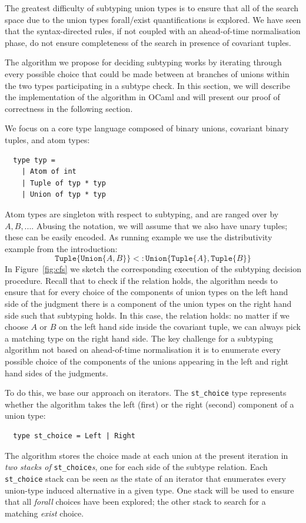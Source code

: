 \documentclass[a4paper,english]{lipics-v2018}
\newcommand{\xt}[1]{\texttt{#1}}
\newcommand{\union}[2]{\xt{Union\{}#1,#2\xt{\}}}
\newcommand{\tuple}[1]{\xt{Tuple\{}#1\xt{\}}}
\begin{document}
The greatest difficulty of subtyping union types is to ensure that all of
the search space due to the union types forall/exist quantifications
is explored.  We have seen that the syntax-directed rules, if not
coupled with an ahead-of-time normalisation phase, do not ensure
completeness of the search in presence of covariant tuples.

The algorithm we propose for deciding subtyping works by iterating through every possible
choice that could be made between at branches of unions within the two types
participating in a subtype check. In this section, we will describe the
implementation of the algorithm in OCaml and will present our proof of
correctness in the following section.

We focus on a core type language composed of binary unions, covariant binary
tuples, and atom types:
\begin{small}
\begin{verbatim}
  type typ =
    | Atom of int
    | Tuple of typ * typ
    | Union of typ * typ
\end{verbatim}
\end{small}
Atom types are singleton with respect to subtyping, and are ranged
over by
\(A, B, ...\).  Abusing the
notation, we will assume that we also have unary
tuples; these can be easily encoded. As running example we use the distributivity example from the
introduction:
$$\tuple{\union{A}{B}} <: \union{\tuple{A}}{\tuple{B}}$$
In Figure~\ref{fig:cfs} we sketch the corresponding
execution of the subtyping decision procedure.  Recall that to check
if the relation holds, the algorithm needs to ensure that for every
choice of the components of union types on the left hand side of the
judgment there is a component of the union types on the right hand
side such that subtyping holds.  In this case, the relation holds: no
matter if we choose $A$ or $B$ on the left hand side inside the
covariant tuple, we can always pick a matching type on the right hand
side.  The key challenge for a subtyping algorithm not based on
ahead-of-time normalisation it is to enumerate
every possible choice of the components of the unions appearing in the
left and right hand sides of the judgments.

To do this, we base our approach on iterators. The \verb|st_choice|
type represents whether the algorithm takes the left (first) or the
right (second)
component of a union type:
\begin{small}
\begin{verbatim}
  type st_choice = Left | Right
\end{verbatim}
\end{small}
The algorithm stores
the choice made at each union at the present iteration in \emph{two stacks of}
\verb|st_choice|\emph{s}, one for each side of the subtype relation.
Each \verb|st_choice| stack can be seen as the state of an iterator that
enumerates every union-type induced alternative in a given type.  One
stack will be used to ensure that all \emph{forall} choices have been
explored; the other stack to search for a matching \emph{exist} choice.
\end{document}
